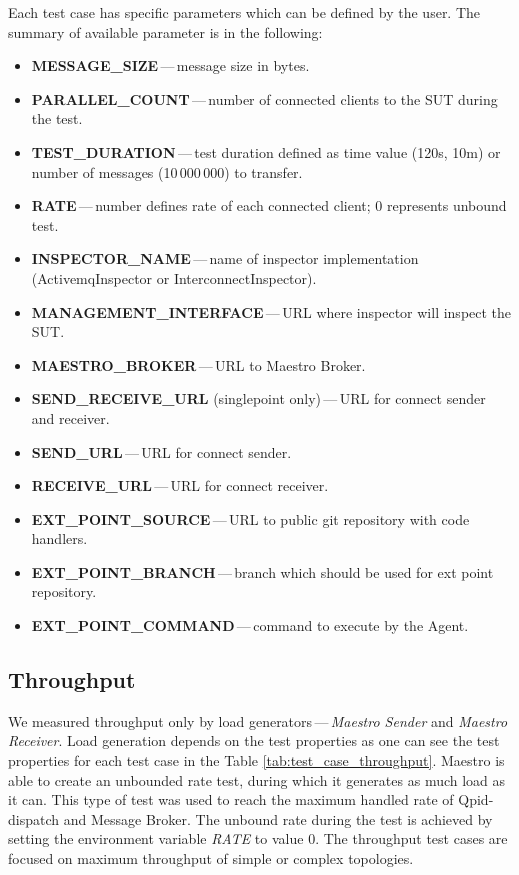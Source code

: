 Each test case has specific parameters which can be defined by the user. The summary of available parameter is in the following:
\begin{itemize}
	\setlength\itemsep{0em}
	\item \textbf{MESSAGE\_SIZE}\,---\,message size in bytes.
	\item \textbf{PARALLEL\_COUNT}\,---\,number of connected clients to the SUT during the test.
	\item \textbf{TEST\_DURATION}\,---\,test duration defined as time value (120s, 10m) or number of messages (10\,000\,000) to transfer.
	\item \textbf{RATE}\,---\,number defines rate of each connected client; 0 represents unbound test.
	\item \textbf{INSPECTOR\_NAME}\,---\,name of inspector implementation (ActivemqInspector or InterconnectInspector).
	\item \textbf{MANAGEMENT\_INTERFACE}\,---\,URL where inspector will inspect the SUT.
	\item \textbf{MAESTRO\_BROKER}\,---\,URL to Maestro Broker.
	\item \textbf{SEND\_RECEIVE\_URL} (singlepoint only)\,---\,URL for connect sender and receiver.
	\item \textbf{SEND\_URL}\,---\,URL for connect sender.
	\item \textbf{RECEIVE\_URL}\,---\,URL for connect receiver.
	\item \textbf{EXT\_POINT\_SOURCE}\,---\,URL to public git repository with code handlers.
	\item \textbf{EXT\_POINT\_BRANCH}\,---\,branch which should be used for ext point repository.
	\item \textbf{EXT\_POINT\_COMMAND}\,---\,command to execute by the Agent.
\end{itemize}

\subsection{Throughput}
\label{Throughput}
We measured throughput only by load generators\,---\,\emph{Maes\-tro Sender} and \emph{Maestro Receiver}. Load generation depends on the test properties as one can see the test properties for each test case in the Table \ref{tab:test_case_throughput}. Maestro is able to create an unbounded rate test, during which it generates as much load as it can. This type of test was used to reach the maximum handled rate of Qpid-dispatch and Message Broker. The unbound rate during the test is achieved by setting the environment variable \emph{RATE} to value 0. The throughput test cases are focused on maximum throughput of simple or complex topologies.

